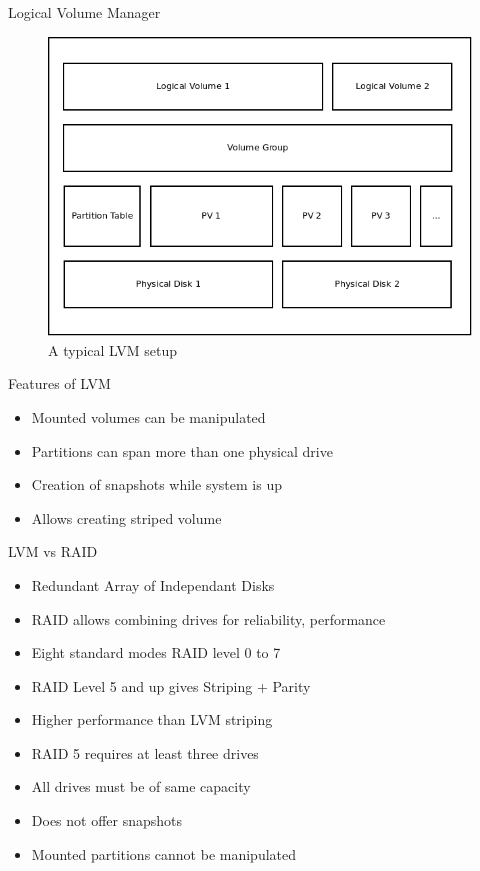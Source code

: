 \documentclass{beamer}
\begin{document}
\begin{frame}{Logical Volume Manager}
    \begin{figure}
        \includegraphics[scale=0.4]{lvm.png}
        \caption{A typical LVM setup}
    \end{figure}
\end{frame}

\begin{frame}{Features of LVM}
    \begin{itemize}
        \item<2-> Mounted volumes can be manipulated
        \item<3-> Partitions can span more than one physical drive
        \item<4-> Creation of snapshots while system is up
        \item<5-> Allows creating striped volume
    \end{itemize}
\end{frame}

\begin{frame}{LVM vs RAID}
    \begin{itemize}
        \item<2-> Redundant Array of Independant Disks 
        \item<3-> RAID allows combining drives for reliability, performance
        \item<4-> Eight standard modes RAID level 0 to 7
        \item<5-> RAID Level 5 and up gives Striping + Parity
        \item<6-> Higher performance than LVM striping
        \item<7-> RAID 5 requires at least three drives
        \item<8-> All drives must be of same capacity
        \item<9-> Does not offer snapshots
        \item<10->Mounted partitions cannot be manipulated
    \end{itemize}
\end{frame}
\end{document}
